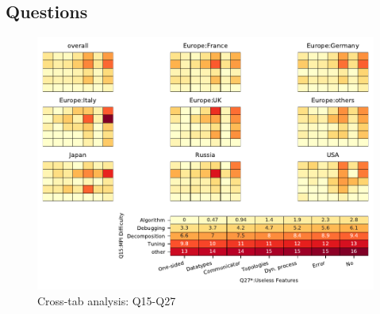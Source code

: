 
\subsection{Questions}


\begin{figure}
\begin{center}
\includegraphics[width=12cm]{../pdfs/Q15-Q27.pdf}
\caption{Cross-tab analysis: Q15-Q27}
\label{fig:Q15-Q27}
\end{center}
\end{figure}
